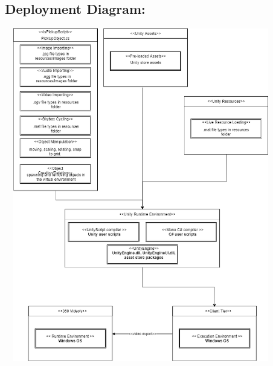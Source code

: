\documentclass{article}
\begin{document}
  	\subsection{Deployment Diagram:}
  	\includegraphics[width=450px,height=550px]{DeploymentDiagram.png}
\end{document}
